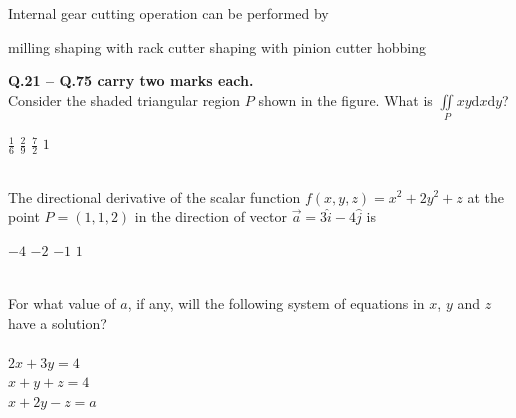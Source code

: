 \documentclass[addpoints,11pt]{exam}
\begin{document}
\begin{questions}
    \question Internal gear cutting operation can be performed by\\
    \begin{choices}
        \choice milling
        \choice shaping with rack cutter
        \choice shaping with pinion cutter
        \choice hobbing
    \end{choices}
    \pagebreak
    \large\textbf{Q.21 -- Q.75 carry two marks each.}\\
    \question Consider the shaded triangular region $P$ shown in the figure. What is $\iint\limits_P xy\mathrm{d}x\mathrm{d}y$?\\
    \begin{center}
    \end{center}

    \begin{oneparchoices}
        \choice $\frac{1}{6}$
        \choice $\frac{2}{9}$
        \choice $\frac{7}{2}$
        \choice $1$
    \end{oneparchoices}\\

    \question The directional derivative of the scalar function $f(x,y,z) = x^2 + 2y^2 + z$ at the point $P=(1,1,2)$ in the direction of vector $\overrightarrow{a} = 3\hat{i} -4\hat{j}$ is\\

    \begin{oneparchoices}
        \choice $-4$
        \choice $-2$
        \choice $-1$
        \choice $1$
    \end{oneparchoices}\\
    \question For what value of $a$, if any, will the following system of equations in $x$, $y$ and $z$ have a solution?\\\\
    $2x+3y=4$\\$x+y+z=4$\\$x+2y-z=a$


\end{questions}
\end{document}
